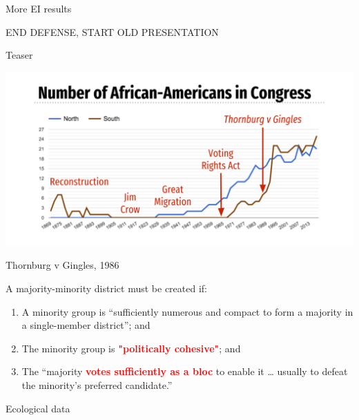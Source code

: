 \documentclass[
  ignorenonframetext,
]{beamer}
\begin{document}
\begin{frame}{More EI results}
\protect\hypertarget{more-ei-results}{}

\end{frame}

\begin{frame}{END DEFENSE, START OLD PRESENTATION}
\protect\hypertarget{end-defense-start-old-presentation}{}

\end{frame}

\begin{frame}{Teaser}
\protect\hypertarget{teaser}{}

\includegraphics{defense_files/figure-beamer/unnamed-chunk-21-1.pdf}

\end{frame}

\begin{frame}{Thornburg v Gingles, 1986}
\protect\hypertarget{thornburg-v-gingles-1986}{}

A majority-minority district must be created if:

\begin{enumerate}
\item
  A minority group is ``sufficiently numerous and compact to form a
  majority in a single-member district''; and
\item
  The minority group is
  \textcolor{red}{\textbf{"politically cohesive"}}; and
\item
  The ``majority \textcolor{red}{\textbf{votes sufficiently as a bloc}}
  to enable it \ldots{} usually to defeat the minority's preferred
  candidate.''
\end{enumerate}

\end{frame}

\begin{frame}{Ecological data}
\protect\hypertarget{ecological-data}{}

\end{frame}
\end{document}
